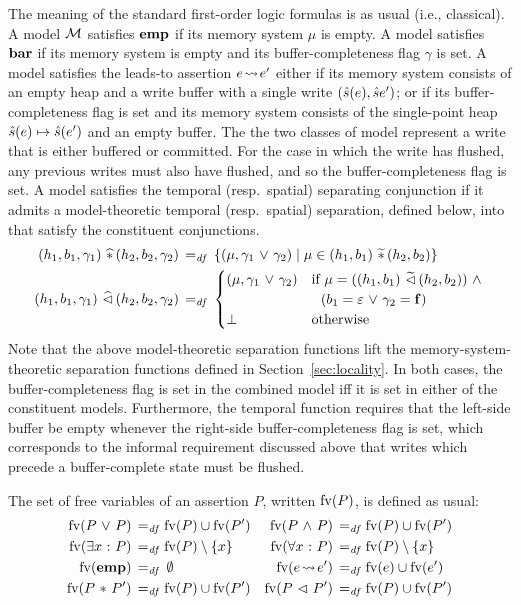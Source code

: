 \documentclass[11pt]{report}
\begin{document}
The meaning of the standard first-order logic formulas is as usual (i.e., classical). A model $\mathcal{M}$ satisfies $\mathbf{emp}$ if its memory system $\mu$ is empty. A model satisfies $\mathbf{bar}$ if its memory system is empty and its buffer-completeness flag $\gamma$ is set. A model satisfies the leads-to assertion $e \!\leadsto\! e'$ either if its memory system consists of an empty heap and a write buffer with a single write $(\hat{s}(e), \hat{s}e')$; or if its buffer-completeness flag is set and its memory system consists of the single-point heap $\hat{s}(e) \mapsto \hat{s}(e')$ and an empty buffer. The the two classes of model represent a write that is either buffered or committed. For the case in which the write has flushed, any previous writes must also have flushed, and so the buffer-completeness flag is set. A model satisfies the temporal (resp.\ spatial) separating conjunction if it admits a model-theoretic temporal (resp.\ spatial) separation, defined below, into that satisfy the constituent conjunctions. 
\begin{align*}
  (h_1,b_1,\gamma_1) \operatorname{\,\widehat{\ast}\,} (h_2,b_2,\gamma_2) \operatorname{\;=_{\mathit{df}}\;} & \left\lbrace (\mu,\gamma_1 \operatorname{\,\vee\,} \gamma_2) \mid \mu \in (h_1,b_1) \operatorname{\,\widetilde{\ast}\,} (h_2,b_2) \right\rbrace \\ 
  (h_1,b_1,\gamma_1) \operatorname{\,\widehat{\vartriangleleft}\,} (h_2,b_2,\gamma_2) \operatorname{\;=_{\mathit{df}}\;} & \begin{cases}
  (\mu,\gamma_1 \operatorname{\,\vee\,} \gamma_2) & \text{if $\mu = ((h_1,b_1) \operatorname{\,\widetilde{\vartriangleleft}\,} (h_2,b_2)) \operatorname{\,\wedge\,}$} \\ 
  &  \text{~~$(b_1 = \varepsilon \operatorname{\,\vee\,} \gamma_2 = \mathbf{f})$} \\ 
  \bot & \text{otherwise}
  \end{cases}
\end{align*}
Note that the above model-theoretic separation functions lift the memory-system-theoretic separation functions defined in Section~\ref{sec:locality}. In both cases, the buffer-completeness flag is set in the combined model iff it is set in either of the constituent models. Furthermore, the temporal function requires that the left-side buffer be empty whenever the right-side buffer-completeness flag is set, which corresponds to the informal requirement discussed above that writes which precede a buffer-complete state must be flushed. 


The set of free variables of an assertion $P$, written $\mathrm{fv}(P)$, is defined as usual: \begin{align*}
    \mathrm{fv}(P \operatorname{\,\vee\,} P) \operatorname{\;=_{\mathit{df}}\;} & \mathrm{fv}(P) \cup \mathrm{fv}(P') & \mathrm{fv}(P \operatorname{\,\wedge\,} P) \operatorname{\;=_{\mathit{df}}\;} & \mathrm{fv}(P) \cup \mathrm{fv}(P') \\ 
    \mathrm{fv}(\exists x \operatorname{\,:\,} P) \operatorname{\;=_{\mathit{df}}\;} &\mathrm{fv}(P) \setminus \left\lbrace x \right\rbrace & \mathrm{fv}(\forall x \operatorname{\,:\,} P) \operatorname{\;=_{\mathit{df}}\;} &\mathrm{fv}(P) \setminus \left\lbrace x \right\rbrace \\
    \mathrm{fv}(\mathbf{emp}) \operatorname{\;=_{\mathit{df}}\;} & \operatorname{\emptyset} &  \mathrm{fv}(e \!\leadsto\! e') \operatorname{\;=_{\mathit{df}}\;} & \mathrm{fv}(e) \cup \mathrm{fv}(e') \\
    \mathrm{fv}(P \operatorname{\,\ast\,} P') \operatorname{\;=_{\mathit{df}}\;} & \mathrm{fv}(P) \cup \mathrm{fv}(P') & 
    \mathrm{fv}(P \operatorname{\,\vartriangleleft\,} P') \operatorname{\;=_{\mathit{df}}\;} & \mathrm{fv}(P) \cup \mathrm{fv}(P') 
\end{align*}
\end{document}
